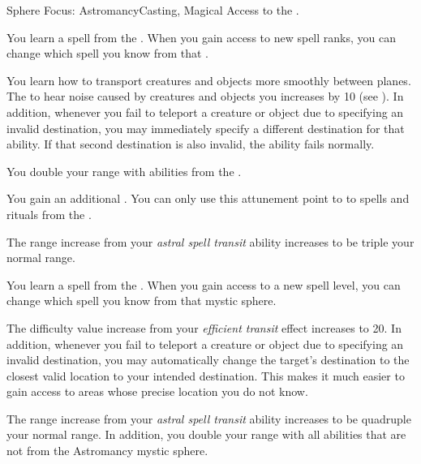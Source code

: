     \begin{feat}{Sphere Focus: Astromancy}{Casting, Magical}
        \featpre Access to the  .

         You learn a spell from the  .
        When you gain access to new spell ranks, you can change which spell you know from that .

         You learn how to transport creatures and objects more smoothly between planes.
        The  to hear noise caused by creatures and objects you  increases by 10 (see ).
        In addition, whenever you fail to teleport a creature or object due to specifying an invalid destination, you may immediately specify a different destination for that ability.
        If that second destination is also invalid, the ability fails normally.

         You double your range with abilities from the  .

         You gain an additional .
        You can only use this attunement point to  to spells and rituals from the  .

         The range increase from your \textit{astral spell transit} ability increases to be triple your normal range.

         You learn a spell from the  .
        When you gain access to a new spell level, you can change which spell you know from that mystic sphere.

         The difficulty value increase from your \textit{efficient transit} effect increases to 20.
        In addition, whenever you fail to teleport a creature or object due to specifying an invalid destination, you may automatically change the target's destination to the closest valid location to your intended destination.
        This makes it much easier to gain access to areas whose precise location you do not know.

         The range increase from your \textit{astral spell transit} ability increases to be quadruple your normal range.
        In addition, you double your range with all  abilities that are not from the Astromancy mystic sphere.
    \end{feat}

